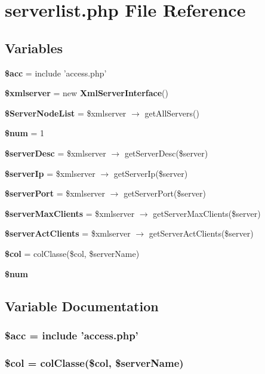 \section{serverlist.php File Reference}
\label{serverlist_8php}


\subsection*{Variables}
\begin{CompactItemize}
\item 
{\bf \$acc} = include 'access.php'
\item 
{\bf \$xmlserver} = new {\bf Xml\-Server\-Interface}()
\item 
{\bf \$Server\-Node\-List} = \$xmlserver $\rightarrow$ get\-All\-Servers()
\item 
{\bf \$num} = 1
\item 
{\bf \$server\-Desc} = \$xmlserver $\rightarrow$ get\-Server\-Desc(\$server)
\item 
{\bf \$server\-Ip} = \$xmlserver $\rightarrow$ get\-Server\-Ip(\$server)
\item 
{\bf \$server\-Port} = \$xmlserver $\rightarrow$ get\-Server\-Port(\$server)
\item 
{\bf \$server\-Max\-Clients} = \$xmlserver $\rightarrow$ get\-Server\-Max\-Clients(\$server)
\item 
{\bf \$server\-Act\-Clients} = \$xmlserver $\rightarrow$ get\-Server\-Act\-Clients(\$server)
\item 
{\bf \$col} = col\-Classe(\$col, \$server\-Name)
\item 
{\bf \$num}
\end{CompactItemize}


\subsection{Variable Documentation}
\subsubsection{\setlength{\rightskip}{0pt plus 5cm}\$acc = include 'access.php'}\label{serverlist_8php_542926c588a05eb69553d79c83cf73da}


\subsubsection{\setlength{\rightskip}{0pt plus 5cm}\$col = col\-Classe(\$col, \$server\-Name)}\label{serverlist_8php_fca5b7d4c9144178253e99d0ada7d519}


